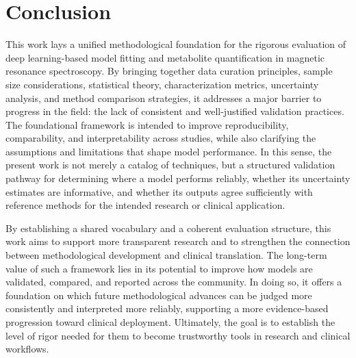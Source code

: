 \section{Conclusion}
This work lays a unified methodological foundation for the rigorous evaluation of deep learning-based model fitting and metabolite quantification in magnetic resonance spectroscopy. By bringing together data curation principles, sample size considerations, statistical theory, characterization metrics, uncertainty analysis, and method comparison strategies, it addresses a major barrier to progress in the field: the lack of consistent and well-justified validation practices. The foundational framework is intended to improve reproducibility, comparability, and interpretability across studies, while also clarifying the assumptions and limitations that shape model performance. In this sense, the present work is not merely a catalog of techniques, but a structured validation pathway for determining where a model performs reliably, whether its uncertainty estimates are informative, and whether its outputs agree sufficiently with reference methods for the intended research or clinical application.

By establishing a shared vocabulary and a coherent evaluation structure, this work aims to support more transparent research and to strengthen the connection between methodological development and clinical translation. The long-term value of such a framework lies in its potential to improve how models are validated, compared, and reported across the \MRS community. In doing so, it offers a foundation on which future methodological advances can be judged more consistently and interpreted more reliably, supporting a more evidence-based progression toward clinical deployment. Ultimately, the goal is to establish the level of rigor needed for them to become trustworthy tools in research and clinical workflows.